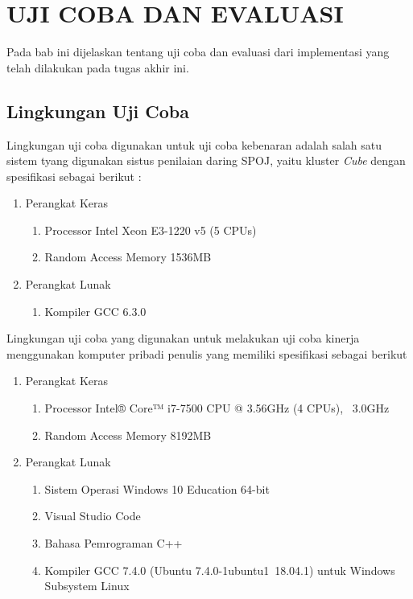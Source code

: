 \chapter{UJI COBA DAN EVALUASI}

Pada bab ini dijelaskan tentang uji coba dan evaluasi dari implementasi yang telah dilakukan pada tugas akhir ini.
\section{Lingkungan Uji Coba}
Lingkungan uji coba digunakan untuk uji coba kebenaran adalah salah satu sistem tyang digunakan sistus penilaian daring SPOJ, yaitu kluster \textit{Cube} dengan spesifikasi sebagai berikut :
\begin{enumerate}
	\item Perangkat Keras
	\begin{enumerate}
		\item Processor Intel Xeon E3-1220 v5 (5 CPUs)
		\item Random Access Memory 1536MB
	\end{enumerate}
	\item Perangkat Lunak
	\begin{enumerate}
		\item Kompiler GCC 6.3.0
	\end{enumerate}
\end{enumerate}

Lingkungan uji coba yang digunakan untuk melakukan uji coba kinerja menggunakan komputer pribadi penulis yang memiliki spesifikasi sebagai berikut
\begin{enumerate}
	\item Perangkat Keras
	\begin{enumerate}
		\item Processor Intel® Core™ i7-7500 CPU @ 3.56GHz (4 CPUs), ~3.0GHz
		\item Random Access Memory 8192MB
	\end{enumerate}
	\item Perangkat Lunak
	\begin{enumerate}
		\item Sistem Operasi Windows 10 Education 64-bit
		\item Visual Studio Code
		\item Bahasa Pemrograman C++
		\item Kompiler GCC 7.4.0 (Ubuntu 7.4.0-1ubuntu1~18.04.1) untuk Windows Subsystem Linux
	\end{enumerate}
\end{enumerate}

